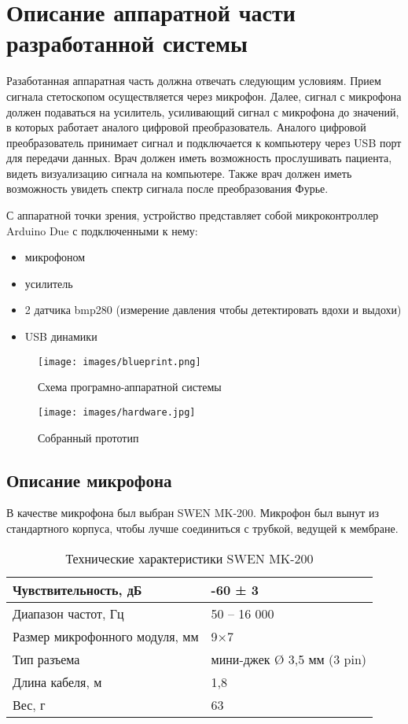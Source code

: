 \documentclass[../main.tex]{subfiles}
\begin{document}
\section{Описание аппаратной части разработанной системы}

Разаботанная аппаратная часть должна отвечать следующим условиям. Прием сигнала стетоскопом осуществляется через микрофон. Далее, сигнал с микрофона должен подаваться на усилитель, усиливающий сигнал с микрофона до значений, в которых работает аналого цифровой преобразователь. Аналого цифровой преобразователь принимает сигнал и подключается к компьютеру через USB порт для передачи данных. Врач должен иметь возможность прослушивать пациента, видеть визуализацию сигнала на компьютере. Также врач должен иметь возможность увидеть спектр сигнала после преобразования Фурье.

С аппаратной точки зрения, устройство представляет собой микроконтроллер Arduino Due с подключенными к нему:
\begin{itemize}
\item микрофоном
\item усилитель
\item 2 датчика bmp280 (измерение давления чтобы детектировать вдохи и выдохи)
\item USB динамики
\end{itemize}

\begin{figure}[H]
\centering
\texttt{[image: images/blueprint.png]}
\caption{Схема програмно-аппаратной системы}
\end{figure}

\begin{figure}[H]
\centering
\texttt{[image: images/hardware.jpg]}
\caption{Собранный прототип}
\end{figure}

\subsection{Описание микрофона}
В качестве микрофона был выбран SWEN MK-200. Микрофон был вынут из стандартного корпуса, чтобы лучше соединиться с трубкой, ведущей к мембране. \\

\begin{table}[h]
\centering
\caption{Технические характеристики SWEN MK-200}
\begin{tabular}{|l|l|}
\hline
Чувствительность, дБ           & -60 ± 3                    \\ \hline
Диапазон частот, Гц            & 50 – 16 000                \\ \hline
Размер микрофонного модуля, мм & 9×7                        \\ \hline
Тип разъема                    & мини-джек Ø 3,5 мм (3 pin) \\ \hline
Длина кабеля, м                & 1,8                        \\ \hline
Вес, г                         & 63                         \\ \hline
\end{tabular}
\end{table}
\end{document}
